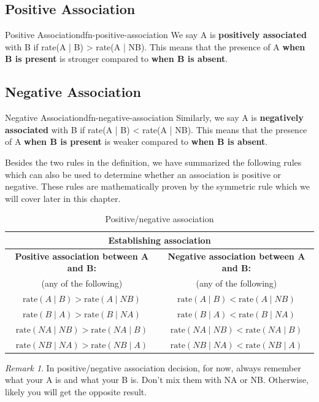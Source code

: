 \documentclass[math,code]{amznotes}
\theoremstyle{remark}
\newtheorem*{remark}{Remark}
\begin{document}
\subsection{Positive Association}
\begin{dfnbox}{Positive Association}{dfn-positive-association}
    We say A is {\color{red} \textbf{positively associated}} with B if rate(A | B) > rate(A | NB). This means that the presence of A \textbf{when B is present} is stronger compared to \textbf{when B is absent}.
\end{dfnbox}

\subsection{Negative Association}
\begin{dfnbox}{Negative Association}{dfn-negative-association}
    Similarly, we say A is {\color{red} \textbf{negatively associated}} with B if rate(A | B) < rate(A | NB). This means that the presence of A \textbf{when B is present} is weaker compared to \textbf{when B is absent}.
\end{dfnbox}

Besides the two rules in the definition, we have summarized the following rules which can also be used to determine whether an association is positive or negative. These rules are mathematically proven by the symmetric rule which we will cover later in this chapter.

\begin{table}[h]
    \centering
    \renewcommand{\arraystretch}{1.5}
    \begin{tabular}{|c|c|}
        \hline
        \multicolumn{2}{|c|}{\textbf{Establishing association}} \\
        \hline
        \textbf{Positive association between A and B:} & \textbf{Negative association between A and B:} \\
        (any of the following) & (any of the following) \\
        \hline
        $\text{rate}(A \mid B) > \text{rate}(A \mid NB)$ & $\text{rate}(A \mid B) < \text{rate}(A \mid NB)$ \\
        $\text{rate}(B \mid A) > \text{rate}(B \mid NA)$ & $\text{rate}(B \mid A) < \text{rate}(B \mid NA)$ \\
        $\text{rate}(NA \mid NB) > \text{rate}(NA \mid B)$ & $\text{rate}(NA \mid NB) < \text{rate}(NA \mid B)$ \\
        $\text{rate}(NB \mid NA) > \text{rate}(NB \mid A)$ & $\text{rate}(NB \mid NA) < \text{rate}(NB \mid A)$ \\
        \hline
    \end{tabular}
    \caption{Positive/negative association}
    \label{tab:positive-negative-association}
\end{table}
\begin{notebox}
    \begin{remark}
        In positive/negative association decision, for now, always remember what your A is and what your B is. Don't mix them with NA or NB. Otherwise, likely you will get the opposite result.
    \end{remark}
\end{notebox}
\end{document}
